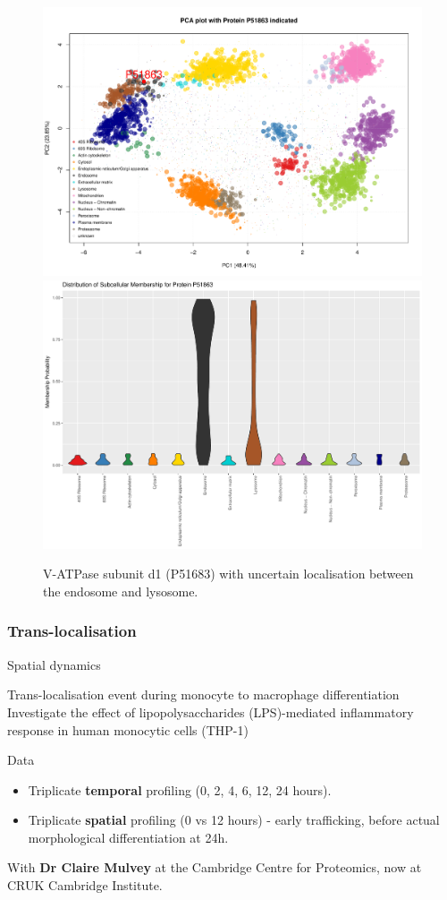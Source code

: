 \begin{frame}{}
  \begin{figure}
    \centering
    \includegraphics[width=.53\linewidth]{./figs_local/PCAP51863.pdf}
    \includegraphics[width=.46\linewidth]{./figs_local/violinp51863.pdf}
    \caption{V-ATPase subunit d1 (P51683) with uncertain localisation
      between the endosome and lysosome.  }
  \label{fig:bgmm}
  \end{figure}
\end{frame}

\subsubsection{Trans-localisation}

\begin{frame}{Spatial dynamics}
  \begin{block}{Trans-localisation event during monocyte to macrophage
      differentiation}
    Investigate the effect of lipopolysaccharides (LPS)-mediated
    inflammatory response in human monocytic cells (THP-1)
  \end{block}

  \begin{block}{Data}
    \begin{itemize}
    \item Triplicate \textbf{temporal} profiling (0, 2, 4, 6, 12, 24
      hours).
    \item Triplicate \textbf{spatial} profiling (0 vs 12 hours) -
      early trafficking, before actual morphological differentiation
      at 24h.
    \end{itemize}
  \end{block}

  With \textbf{Dr Claire Mulvey} at the Cambridge Centre for
  Proteomics, now at CRUK Cambridge Institute.

\end{frame}



